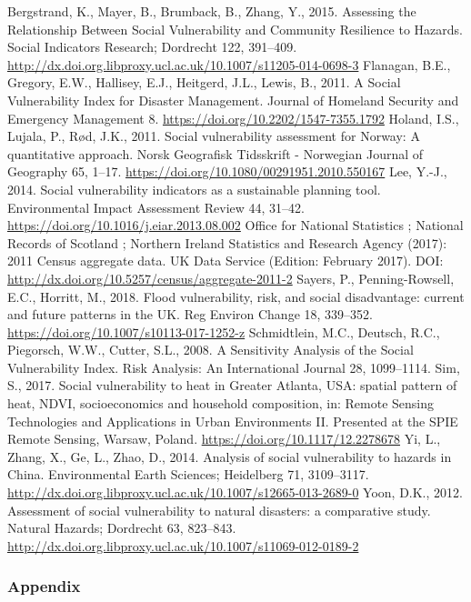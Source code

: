 \documentclass[]{article}
\begin{document}
Bergstrand, K., Mayer, B., Brumback, B., Zhang, Y., 2015. Assessing the
Relationship Between Social Vulnerability and Community Resilience to
Hazards. Social Indicators Research; Dordrecht 122, 391--409.
\url{http://dx.doi.org.libproxy.ucl.ac.uk/10.1007/s11205-014-0698-3}
Flanagan, B.E., Gregory, E.W., Hallisey, E.J., Heitgerd, J.L., Lewis,
B., 2011. A Social Vulnerability Index for Disaster Management. Journal
of Homeland Security and Emergency Management 8.
\url{https://doi.org/10.2202/1547-7355.1792} Holand, I.S., Lujala, P.,
Rød, J.K., 2011. Social vulnerability assessment for Norway: A
quantitative approach. Norsk Geografisk Tidsskrift - Norwegian Journal
of Geography 65, 1--17.
\url{https://doi.org/10.1080/00291951.2010.550167} Lee, Y.-J., 2014.
Social vulnerability indicators as a sustainable planning tool.
Environmental Impact Assessment Review 44, 31--42.
\url{https://doi.org/10.1016/j.eiar.2013.08.002} Office for National
Statistics ; National Records of Scotland ; Northern Ireland Statistics
and Research Agency (2017): 2011 Census aggregate data. UK Data Service
(Edition: February 2017). DOI:
\url{http://dx.doi.org/10.5257/census/aggregate-2011-2} Sayers, P.,
Penning-Rowsell, E.C., Horritt, M., 2018. Flood vulnerability, risk, and
social disadvantage: current and future patterns in the UK. Reg Environ
Change 18, 339--352. \url{https://doi.org/10.1007/s10113-017-1252-z}
Schmidtlein, M.C., Deutsch, R.C., Piegorsch, W.W., Cutter, S.L., 2008. A
Sensitivity Analysis of the Social Vulnerability Index. Risk Analysis:
An International Journal 28, 1099--1114. Sim, S., 2017. Social
vulnerability to heat in Greater Atlanta, USA: spatial pattern of heat,
NDVI, socioeconomics and household composition, in: Remote Sensing
Technologies and Applications in Urban Environments II. Presented at the
SPIE Remote Sensing, Warsaw, Poland.
\url{https://doi.org/10.1117/12.2278678} Yi, L., Zhang, X., Ge, L.,
Zhao, D., 2014. Analysis of social vulnerability to hazards in China.
Environmental Earth Sciences; Heidelberg 71, 3109--3117.
\url{http://dx.doi.org.libproxy.ucl.ac.uk/10.1007/s12665-013-2689-0}
Yoon, D.K., 2012. Assessment of social vulnerability to natural
disasters: a comparative study. Natural Hazards; Dordrecht 63, 823--843.
\url{http://dx.doi.org.libproxy.ucl.ac.uk/10.1007/s11069-012-0189-2}

\subsubsection{Appendix}\label{appendix}
\end{document}
